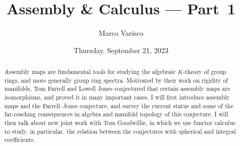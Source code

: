 \documentclass{UAmathtalk}
\author{Marco Varisco}
\title{Assembly \& Calculus --- Part~1}
\date{Thursday, September 21, 2023}
\begin{document}
\maketitle

\begin{abstract}
Assembly maps are fundamental tools for studying the algebraic $K$-theory of group rings, and more generally group ring spectra. Motivated by their work on rigidity of manifolds, Tom Farrell and Lowell Jones conjectured that certain assembly maps are isomorphisms, and proved it in many important cases. I will first introduce assembly maps and the Farrell–Jones conjecture, and survey the current status and some of the far-reaching consequences in algebra and manifold topology of this conjecture. I will then talk about new joint work with Tom Goodwillie, in which we use functor calculus to study, in particular, the relation between the conjectures with spherical and integral coefficients.
\end{abstract}
\end{document}
